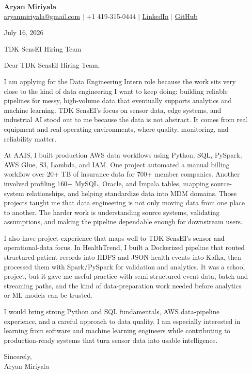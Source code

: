 \documentclass[letterpaper,11pt]{article}
\begin{document}
{\Large\textbf{Aryan Miriyala}}\\
\href{mailto:aryanmiriyala@gmail.com}{aryanmiriyala@gmail.com} $|$ +1 419-315-0444 $|$
\href{https://www.linkedin.com/in/aryan-miriyala-7788a21b6/}{LinkedIn} $|$
\href{https://github.com/aryanmiriyala}{GitHub}

July 16, 2026

TDK SensEI Hiring Team

Dear TDK SensEI Hiring Team,

I am applying for the Data Engineering Intern role because the work sits very close to the kind of data engineering I want to keep doing: building reliable pipelines for messy, high-volume data that eventually supports analytics and machine learning. TDK SensEI's focus on sensor data, edge systems, and industrial AI stood out to me because the data is not abstract. It comes from real equipment and real operating environments, where quality, monitoring, and reliability matter.

At AAIS, I built production AWS data workflows using Python, SQL, PySpark, AWS Glue, S3, Lambda, and IAM. One project automated a manual billing workflow over 20+ TB of insurance data for 700+ member companies. Another involved profiling 160+ MySQL, Oracle, and Impala tables, mapping source-system relationships, and helping standardize data into MDM domains. Those projects taught me that data engineering is not only moving data from one place to another. The harder work is understanding source systems, validating assumptions, and making the pipeline dependable enough for downstream users.

I also have project experience that maps well to TDK SensEI's sensor and operational-data focus. In HealthTrend, I built a Dockerized pipeline that routed structured patient records into HDFS and JSON health events into Kafka, then processed them with Spark/PySpark for validation and analytics. It was a school project, but it gave me useful practice with semi-structured event data, batch and streaming paths, and the kind of data-preparation work needed before analytics or ML models can be trusted.

I would bring strong Python and SQL fundamentals, AWS data-pipeline experience, and a careful approach to data quality. I am especially interested in learning from software and machine learning engineers while contributing to production-ready systems that turn sensor data into usable intelligence.

Sincerely,\\
Aryan Miriyala
\end{document}
